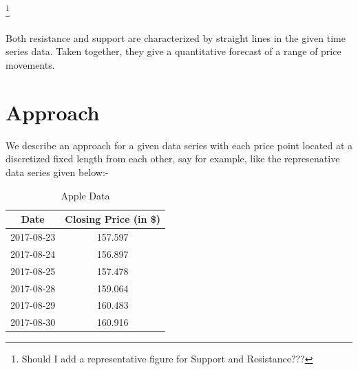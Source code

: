 \documentclass[letterpaper, 12pt] {article}
\begin{document}
	\footnote{Should I add a representative figure for Support and Resistance???}
	
	
	\paragraph{} Both resistance and support are characterized by straight lines in the given time series data. Taken together, they give a quantitative forecast of a range of price movements.  

	\section{Approach}
	We describe an approach for a given data series with each price point located at a discretized fixed length from each other, say for example, like the represenative data series given below:-

	
	\begin{table}[h!]
		\centering
		\caption {Apple Data} \label{tab:} 
		
		\begin{tabular}{|c|c|}
			\hline
			\rowcolor[HTML]{C0C0C0} 
			{\color[HTML]{9A0000} { \textbf{Date}}} & {\color[HTML]{9A0000} {\textbf{Closing Price (in \$)}}} \\ \hline
			2017-08-23                                 & 157.597                                                     \\ \hline
			2017-08-24                                 & 156.897                                                     \\ \hline
			2017-08-25                                 & 157.478                                                     \\ \hline
			2017-08-28                                 & 159.064                                                     \\ \hline
			2017-08-29                                 & 160.483                                                     \\ \hline
			2017-08-30                                 & 160.916                                                     \\ \hline
		\end{tabular}
	\end{table}
	
\end{document}

